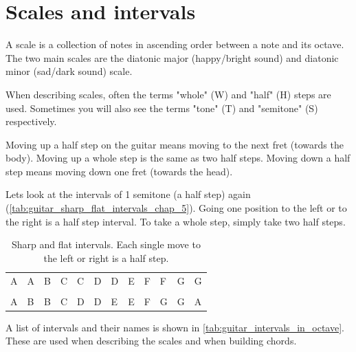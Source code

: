\newpage

\section{Scales and intervals}

A scale is a collection of notes in ascending order between a note and its octave. The two main scales are the diatonic major (happy/bright sound) and diatonic minor (sad/dark sound) scale.

When describing scales, often the terms "whole" (W) and "half" (H) steps are used. Sometimes you will also see the terms "tone" (T) and "semitone" (S) respectively.

Moving up a half step on the guitar means moving to the next fret (towards the body). Moving up a whole step is the same as two half steps. Moving down a half step means moving down one fret (towards the head).

Lets look at the intervals of 1 semitone (a half step) again (\autoref{tab:guitar_sharp_flat_intervals_chap_5}). Going one position to the left or to the right is a half step interval. To take a whole step, simply take two half steps.

\begin{table}[h]
	\centering
	\begin{NiceTabular}{*{12}{P{5mm}}}
		\large{A} & \large{A\sharp} & \large{B} & \large{C} & \large{C\sharp} & \large{D} & \large{D\sharp} & \large{E} & \large{F} & \large{F\sharp} & \large{G} & \large{G\sharp} \\ \\
		\large{A} & \large{B\flat} & \large{B} & \large{C} & \large{D\flat} & \large{D} & \large{E\flat} & \large{E} & \large{F} & \large{G\flat}& \large{G} & \large{A\flat}
	\end{NiceTabular}
	\caption{Sharp and flat intervals. Each single move to the left or right is a half step.}
	\label{tab:guitar_sharp_flat_intervals_chap_5}
\end{table}

A list of intervals and their names is shown in \autoref{tab:guitar_intervals_in_octave}. These are used when describing the scales and when building chords.

